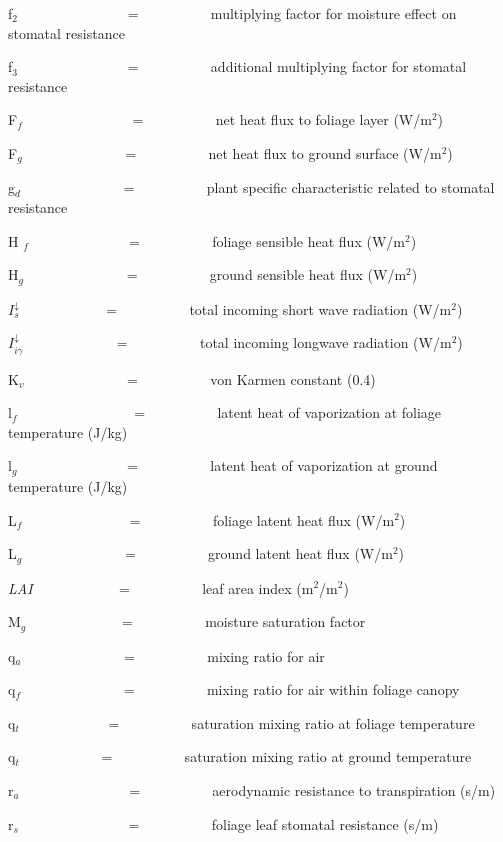 f\(_{2}\)~~~~~~~~~~~~~~~ = ~~~~~~~~~ multiplying factor for moisture effect on stomatal resistance

f\(_{3}\)~~~~~~~~~~~~~~~ = ~~~~~~~~~ additional multiplying factor for stomatal resistance

F\(_{f}\)~~~~~~~~~~~~~~~ = ~~~~~~~~~ net heat flux to foliage layer (W/m\(^{2}\))

F\(_{g}\)~~~~~~~~~~~~~~ = ~~~~~~~~~ net heat flux to ground surface (W/m\(^{2}\))

g\(_{d}\)~~~~~~~~~~~~~~ = ~~~~~~~~~ plant specific characteristic related to stomatal resistance

H \emph{\(_{f}\)} ~~~~~~~~~~~~~ = ~~~~~~~~~ foliage sensible heat flux (W/m\(^{2}\))

H\(_{g}\)~~~~~~~~~~~~~~ = ~~~~~~~~~ ground sensible heat flux (W/m\(^{2}\))

\(I_s^ \downarrow\) ~~~~~~~~~~~ = ~~~~~~~~~ total incoming short wave radiation (W/m\(^{2}\))

\(I_{i\gamma }^ \downarrow\) ~~~~~~~~~~~~ = ~~~~~~~~~ total incoming longwave radiation (W/m\(^{2}\))

K\(_{v}\)~~~~~~~~~~~~~~ = ~~~~~~~~~ von Karmen constant (0.4)

l\(_{f}\)~~~~~~~~~~~~~~~~ = ~~~~~~~~~ latent heat of vaporization at foliage temperature (J/kg)

l\(_{g}\)~~~~~~~~~~~~~~~ = ~~~~~~~~~ latent heat of vaporization at ground temperature (J/kg)

L\emph{\(_{f}\)}~ ~~~~~~~~~~~~~ = ~~~~~~~~~ foliage latent heat flux (W/m\(^{2}\))

L\(_{g}\)~~~~~~~~~~~~~~ = ~~~~~~~~~ ground latent heat flux (W/m\(^{2}\))

\emph{LAI}~ ~~~~~~~~~~ = ~~~~~~~~~ leaf area index (m\(^{2}\)/m\(^{2}\))

M\(_{g}\)~~~~~~~~~~~~~ = ~~~~~~~~~ moisture saturation factor

q\(_{a}\)~~~~~~~~~~~~~~ = ~~~~~~~~~ mixing ratio for air

q\(_{f}\)~~~~~~~~~~~~~~ = ~~~~~~~~~ mixing ratio for air within foliage canopy

q\(_{t}\)~~~~~~~~~~~~ = ~~~~~~~~~ saturation mixing ratio at foliage temperature

q\(_{t}\)~~~~~~~~~~~ = ~~~~~~~~~ saturation mixing ratio at ground temperature

r\(_{a}\)~~~~~~~~~~~~~~~ = ~~~~~~~~~ aerodynamic resistance to transpiration (s/m)

r\(_{s}\)~~~~~~~~~~~~~~~ = ~~~~~~~~~ foliage leaf stomatal resistance (s/m)

